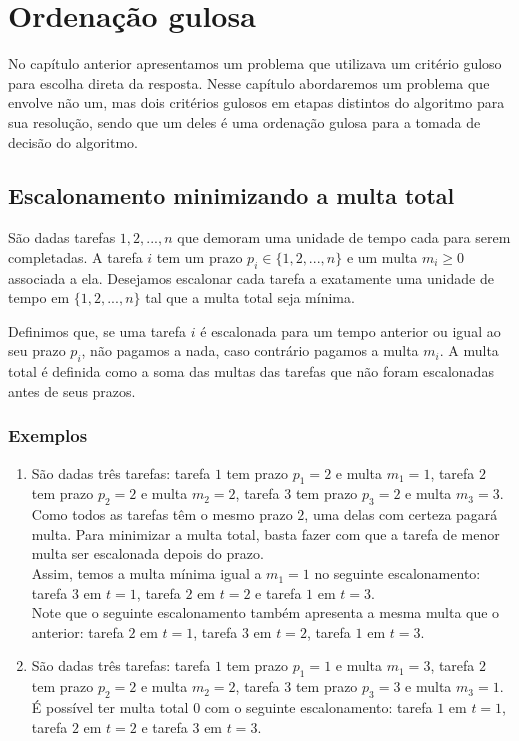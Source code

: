 \chapter{Ordenação gulosa}
\label{ordenacao}

No capítulo anterior apresentamos um problema que utilizava um critério guloso para escolha direta da resposta. Nesse capítulo abordaremos um problema que envolve não um, mas dois critérios gulosos em etapas distintos do algoritmo para sua resolução, sendo que um deles é uma ordenação gulosa para a tomada de decisão do algoritmo.

\section{Escalonamento minimizando a multa total}

São dadas tarefas $1, 2, ..., n$ que demoram uma unidade de tempo cada para serem completadas. A tarefa $i$ tem um prazo $p_i \in \{1, 2, ..., n\}$ e um multa $m_i \geq 0$ associada a ela. Desejamos escalonar cada tarefa a exatamente uma unidade de tempo em $\{1, 2, ..., n\}$ tal que a multa total seja mínima.

Definimos que, se uma tarefa $i$ é escalonada para um tempo anterior ou igual ao seu prazo $p_i$, não pagamos a nada, caso contrário pagamos a multa $m_i$. A multa total é definida como a soma das multas das tarefas que não foram escalonadas antes de seus prazos.

\subsection*{Exemplos}

\begin{enumerate}
    \item São dadas três tarefas: tarefa $1$ tem prazo $p_1 = 2$ e multa $m_1 = 1$, tarefa $2$ tem prazo $p_2 = 2$ e multa $m_2 = 2$, tarefa $3$ tem prazo $p_3 = 2$ e multa $m_3 = 3$.\\
    Como todos as tarefas têm o mesmo prazo $2$, uma delas com certeza pagará multa. Para minimizar a multa total, basta fazer com que a tarefa de menor multa ser escalonada depois do prazo.\\
    Assim, temos a multa mínima igual a $m_1 = 1$ no seguinte escalonamento: tarefa $3$ em $t = 1$, tarefa $2$ em $t = 2$ e tarefa $1$ em $t = 3$.\\
    Note que o seguinte escalonamento também apresenta a mesma multa que o anterior: tarefa $2$ em $t = 1$, tarefa $3$ em $t = 2$, tarefa $1$ em $t = 3$.
    \item São dadas três tarefas: tarefa $1$ tem prazo $p_1 = 1$ e multa $m_1 = 3$, tarefa $2$ tem prazo $p_2 = 2$ e multa $m_2 = 2$, tarefa $3$ tem prazo $p_3 = 3$ e multa $m_3 = 1$.\\
    É possível ter multa total $0$ com o seguinte escalonamento: tarefa $1$ em $t = 1$, tarefa $2$ em $t = 2$ e tarefa $3$ em $t = 3$.
\end{enumerate}

